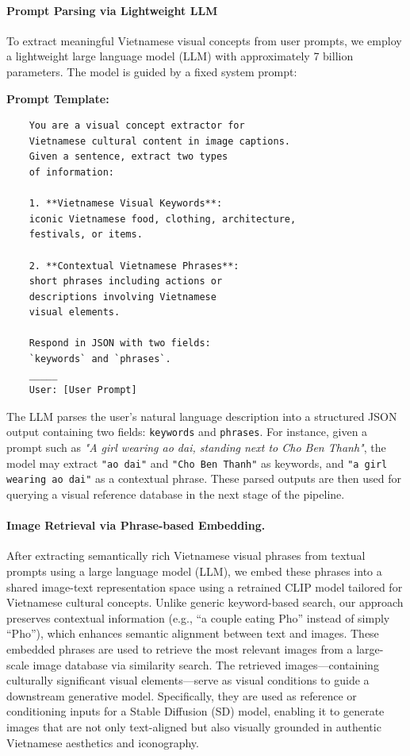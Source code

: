 \documentclass[conference]{IEEEtran}
\begin{document}
\paragraph{Prompt Parsing via Lightweight LLM}
To extract meaningful Vietnamese visual concepts from user prompts, we employ a lightweight large language model (LLM) with approximately 7 billion parameters. The model is guided by a fixed system prompt: 

\noindent\textbf{Prompt Template:}
{\small
	\begin{verbatim}
	You are a visual concept extractor for 
	Vietnamese cultural content in image captions. 
	Given a sentence, extract two types 
	of information:

	1. **Vietnamese Visual Keywords**: 
	iconic Vietnamese food, clothing, architecture, 
	festivals, or items.

	2. **Contextual Vietnamese Phrases**: 
	short phrases including actions or 
	descriptions involving Vietnamese 
	visual elements.

	Respond in JSON with two fields: 
	`keywords` and `phrases`.
	_____
	User: [User Prompt]
	\end{verbatim}
}

The LLM parses the user's natural language description into a structured JSON output containing two fields: \texttt{keywords} and \texttt{phrases}. For instance, given a prompt such as \textit{"A girl wearing ao dai, standing next to Cho Ben Thanh"}, the model may extract \texttt{"ao dai"} and \texttt{"Cho Ben Thanh"} as keywords, and \texttt{"a girl wearing ao dai"} as a contextual phrase. These parsed outputs are then used for querying a visual reference database in the next stage of the pipeline.

\paragraph{Image Retrieval via Phrase-based Embedding.} 
After extracting semantically rich Vietnamese visual phrases from textual prompts using a large language model (LLM), we embed these phrases into a shared image-text representation space using a retrained CLIP model tailored for Vietnamese cultural concepts. Unlike generic keyword-based search, our approach preserves contextual information (e.g., ``a couple eating Pho'' instead of simply ``Pho''), which enhances semantic alignment between text and images. These embedded phrases are used to retrieve the most relevant images from a large-scale image database via similarity search. The retrieved images—containing culturally significant visual elements—serve as visual conditions to guide a downstream generative model. Specifically, they are used as reference or conditioning inputs for a Stable Diffusion (SD) model, enabling it to generate images that are not only text-aligned but also visually grounded in authentic Vietnamese aesthetics and iconography.
\end{document}
